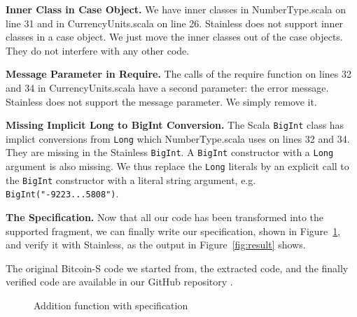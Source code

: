 \documentclass[hyphens, a4paper,USenglish,cleveref, autoref, thm-restate]{oasics-v2019}
\renewcommand{\paragraph}{\textbf}%
\begin{document}
\paragraph{Inner Class in Case Object.} We have inner classes in
NumberType.scala on line 31 and in CurrencyUnits.scala on line
26. Stainless does not support inner classes in a case object. We just
move the inner classes out of the case objects. They do not interfere
with any other code.

\paragraph{Message Parameter in Require.} The calls of the require
function on lines 32 and 34 in CurrencyUnits.scala have a second
parameter: the error message. Stainless does not support the message
parameter. We simply remove it.

\paragraph{Missing Implicit Long to BigInt Conversion.} The Scala
\texttt{BigInt} class has implict conversions from \texttt{Long} which
NumberType.scala uses on lines 32 and 34. They are missing in the
Stainless \texttt{BigInt}. A \texttt{BigInt} constructor with a
\texttt{Long} argument is also missing. We thus replace the
\texttt{Long} literals by an explicit call to the \texttt{BigInt}
constructor with a literal string argument,
e.g. \texttt{BigInt("-9223...5808")}.


\paragraph{The Specification.} Now that all our code has been
transformed into the supported fragment, we can finally write our
specification, shown in Figure~\ref{fig:spec}, and verify it with
Stainless, as the output in Figure~\ref{fig:result} shows.

The original Bitcoin-S code we started from, the extracted code, and
the finally verified code are available in our GitHub repository \cite{verification:github}.

\begin{figure}

\caption{Addition function with specification}
\label{fig:spec}
\end{figure}
\end{document}
